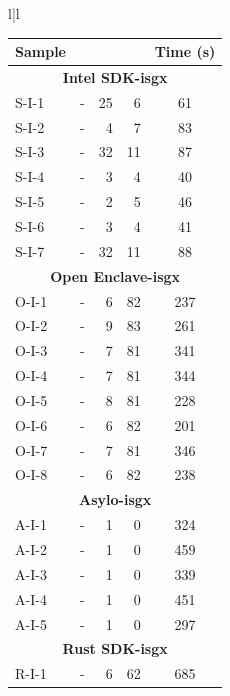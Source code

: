 \begin{table}
	\begin{tabular}{l|l}
		\begin{minipage}[t]{.45\textwidth}
			\scriptsize
			\centering
			\begin{threeparttable}[Ht!]
				\begin{tabularx}{\columnwidth}{Xrrrc}
					\toprule
					\textbf{Sample\tnote{1}} & 
					\rot{\textbf{Flags\tnote{2}}}&\rot{\textbf{Ecall}}&\rot{\textbf{Ocall}}&
					\textbf{Time (s)}\\
					\midrule
					\multicolumn{5}{c}{\textbf{Intel SDK-isgx}} \\
					\midrule
					S-I-1  & - & 25 & 6  & 61 \\
					S-I-2  & - & 4  & 7  & 83 \\
					S-I-3  & - & 32 & 11 & 87 \\
					S-I-4  & - & 3  & 4  & 40 \\
					S-I-5  & - & 2  & 5  & 46 \\
					S-I-6  & - & 3  & 4  & 41 \\
					S-I-7  & - & 32 & 11 & 88 \\
					\midrule
					\multicolumn{5}{c}{\textbf{Open Enclave-isgx}} \\
					\midrule
					O-I-1  & - & 6  & 82  & 237 \\
					O-I-2  & - & 9  & 83  & 261 \\
					O-I-3  & - & 7  & 81  & 341 \\
					O-I-4  & - & 7  & 81  & 344 \\
					O-I-5  & - & 8  & 81  & 228 \\
					O-I-6  & - & 6  & 82  & 201 \\
					O-I-7  & - & 7  & 81  & 346 \\
					O-I-8  & - & 6  & 82  & 238 \\
					\midrule
					\multicolumn{5}{c}{\textbf{Asylo-isgx}} \\
					\midrule
					A-I-1  & - & 1  & 0  & 324 \\
					A-I-2  & - & 1  & 0  & 459 \\
					A-I-3  & - & 1  & 0  & 339 \\
					A-I-4  & - & 1  & 0  & 451 \\
					A-I-5  & - & 1  & 0  & 297 \\
					\midrule
					\multicolumn{5}{c}{\textbf{Rust SDK-isgx}} \\
					\midrule
					R-I-1  & - & 6  & 62  & 685 \\

\end{tabularx}
\end{threeparttable}
\end{minipage}
\end{tabular}
\end{table}
